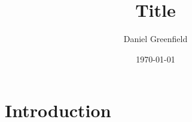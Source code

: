 \documentclass[11pt,a4paper]{article}
\title{Title}
\author{Daniel Greenfield}
\date{\today}
\begin{document}
\maketitle

\section{Introduction}
\end{document}
